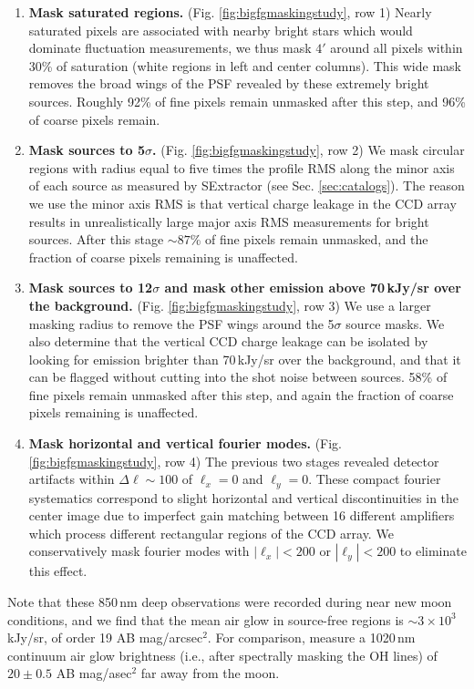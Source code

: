 \documentclass[numberedappendix]{emulateapj}
\begin{document}
\begin{enumerate}
	\item \textbf{Mask saturated regions.} (Fig. \ref{fig:bigfgmaskingstudy}, row 1) Nearly saturated pixels are associated with nearby bright stars which would dominate fluctuation measurements, we thus mask $4'$ around all pixels within 30\% of saturation (white regions in left and center columns). This wide mask removes the broad wings of the PSF revealed by these extremely bright sources. Roughly 92\% of fine pixels remain unmasked after this step, and 96\% of coarse pixels remain.
	\item \textbf{Mask sources to 5$\sigma$.} (Fig. \ref{fig:bigfgmaskingstudy}, row 2) We mask circular regions with radius equal to five times the profile RMS along the minor axis of each source as measured by SExtractor (see Sec. \ref{sec:catalogs}). The reason we use the minor axis RMS is that vertical charge leakage in the CCD array results in unrealistically large major axis RMS measurements for bright sources. After this stage $\sim87$\% of fine pixels remain unmasked, and the fraction of coarse pixels remaining is unaffected.
	\item \textbf{Mask sources to 12$\sigma$ and mask other emission above 70\,kJy/sr over the background.} (Fig. \ref{fig:bigfgmaskingstudy}, row 3) We use a larger masking radius to remove the PSF wings around the 5$\sigma$ source masks. We also determine that the vertical CCD charge leakage can be isolated by looking for emission brighter than 70\,kJy/sr over the background, and that it can be flagged without cutting into the shot noise between sources. 58\% of fine pixels remain unmasked after this step, and again the fraction of coarse pixels remaining is unaffected.
	\item \textbf{Mask horizontal and vertical fourier modes.} (Fig. \ref{fig:bigfgmaskingstudy}, row 4) The previous two stages revealed detector artifacts within $\Delta\ell \sim100$ of $\ell_x=0$ and $\ell_y=0$. These compact fourier systematics correspond to slight horizontal and vertical discontinuities in the center image due to imperfect gain matching between 16 different amplifiers which process different rectangular regions of the CCD array. We conservatively mask fourier modes with $|\ell_x|<200$ or $|\ell_y|<200$ to eliminate this effect.
\end{enumerate}

Note that these 850\,nm deep observations were recorded during near new moon conditions, and we find that the mean air glow in source-free regions is $\sim3\times10^3$ kJy/sr, of order 19 AB mag/arcsec$^2$. For comparison, \citet{sullivan12} measure a 1020\,nm continuum air glow brightness (i.e., after spectrally masking the OH lines) of $20\pm0.5$ AB mag/asec$^2$ far away from the moon. 
\end{document}
